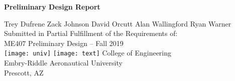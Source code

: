 \begin{titlepage}
\flushleft
\doublespacing\center
\Large
\null\vfill

\textbf{Preliminary Design Report}
\vspace{4ex}\normalsize

Trey Dufrene \hfill Zack Johnson \hfill David Orcutt \hfill Alan Wallingford \hfill Ryan Warner
\vfill
\vspace{0.8cm}
  \normalsize
  Submitted in Partial Fulfillment of the Requirements of: \\
  ME407 Preliminary Design -- Fall 2019\\

  \vspace{0.6cm}
  \texttt{[image: univ]}
  \texttt{[image: text]}
  \vspace{.2ex}\onehalfspacing
  College of Engineering\\
  Embry-Riddle Aeronautical University\\
  Prescott, AZ\\
\end{titlepage}



